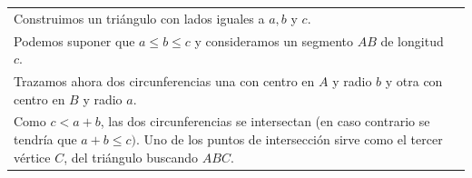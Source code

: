\documentclass[12pt,a4paper,oneside]{book}
\begin{document}
\begin{tabular}{p{15.9cm} p{1cm}}
\\Construimos un triángulo con lados iguales a $a, b$ y $c$. 
\\Podemos suponer que $a \leq b \leq c$ y consideramos un segmento $AB$ de longitud $c$.
\\Trazamos ahora dos circunferencias una con centro en $A$ y radio $b$ y otra con centro en $B$ y radio $a$.
\\Como $c<a+b$, las dos circunferencias se intersectan (en caso contrario se tendría que $a+b \leq c)$. Uno de los puntos de intersección sirve como el tercer vértice $C$, del triángulo buscando $ABC$.
\end{tabular}
\end{document}
